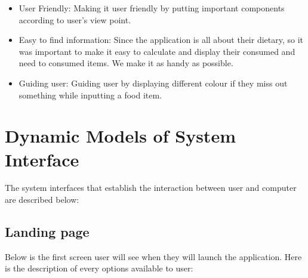 \documentclass{scrreprt}
\begin{document}
\begin{itemize}
\item User Friendly: Making it user friendly by putting important components according to user's view point.
\item Easy to find information: Since the application is all about their dietary, so it was important to make it easy to calculate and display their consumed and need to consumed items. We make it as handy as possible.
\item Guiding user: Guiding user by displaying different colour if they miss out something while inputting a food item.
\end{itemize}

\section{Dynamic Models of System Interface}
The system interfaces that establish the interaction between user and computer are described below:

\clearpage

\subsection{Landing page}
Below is the first screen user will see when they will launch the application. Here is the description of every options available to user:
\end{document}
